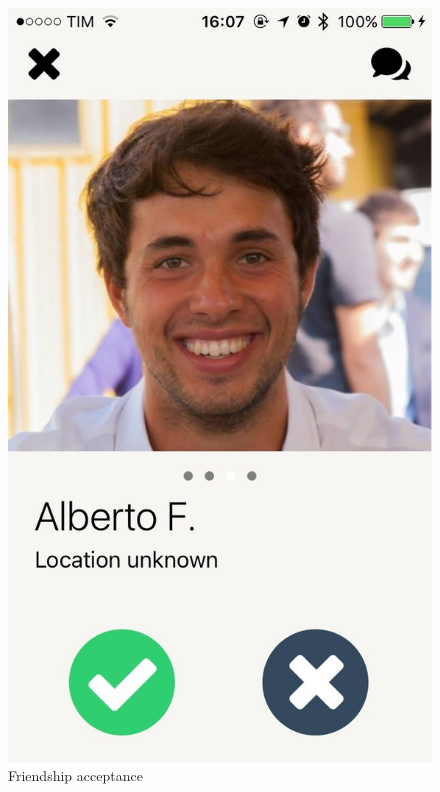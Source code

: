 \newpage

\begin{multicols}{2}
\begin{figure}[H]
\centering
\centering
\includegraphics[scale=0.15]{./images/friendship_acc.jpg}
\caption{\label{Friendhip acceptance}Friendship acceptance}
\end{figure}


\end{multicols}
